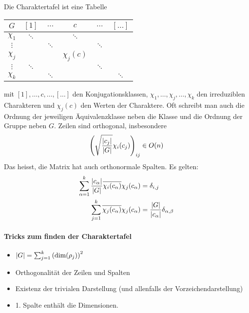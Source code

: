 \begin{definition}[Charaktertafel]
    Die Charaktertafel ist eine Tabelle
    \begin{center}
        \begin{tabular}{c | c c c c c}
            $G$ & $[1]$ & $\dots$ & $c$ & $\dots$ & $[\dots]$ \\ \hline
            $\chi_1$ & $\ddots$ & & $\ddots$ & & \\
            $\vdots$ & & $\ddots$ & & $\ddots$ & \\
            $\chi_j$ & & & $\chi_j(c)$ & & \\
            $\vdots$ & $\ddots$ & & & $\ddots$ & \\
            $\chi_k$ & & $\ddots$ & & & $\ddots$
        \end{tabular}
    \end{center}
\end{definition}
mit $[1],\dots,c,\dots,[\dots]$ den Konjugationsklassen,
$\chi_1,\dots,\chi_j,\dots,\chi_k$ den irreduziblen Charakteren
und $\chi_j(c)$ den Werten der Charaktere. Oft schreibt man auch die Ordnung
der jeweiligen Äquivalenzklasse neben die Klasse und die Ordnung der Gruppe
neben $G$. Zeilen sind orthogonal, insbesondere
\begin{align*}
    \left( \sqrt{\frac{\left\vert c_j \right\vert}{\left\vert G \right\vert}} \chi_i (c_j) \right)_{ij} \in O(n)
\end{align*}
Das heisst, die Matrix hat auch orthonormale Spalten. Es gelten:
\begin{align*}
    \sum_{\alpha=1}^k \frac{\left\vert c_\alpha \right\vert}{\left\vert G \right\vert} \overline{\chi_i(c_\alpha)} \chi_j (c_\alpha) &= \delta_{i,j}
    \\
    \sum_{j=1}^k \overline{\chi_j (c_\alpha)} \chi_j (c_\alpha) &= \frac{\left\vert G \right\vert}{\left\vert c_\alpha \right\vert} \delta_{\alpha,\beta}
\end{align*}

\paragraph{Tricks zum finden der Charaktertafel}
\begin{itemize}
    \item $\left\vert G \right\vert = \sum_{j=1}^k \left( \dim(\rho_j) \right)^2$
    \item Orthogonalität der Zeilen und Spalten
    \item Existenz der trivialen Darstellung (und allenfalls der Vorzeichendarstellung)
    \item 1. Spalte enthält die Dimensionen.
\end{itemize}

